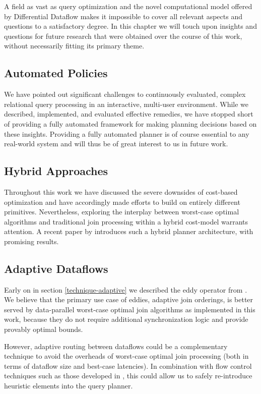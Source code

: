 \documentclass[../index.tex]{subfiles}
\begin{document}
A field as vast as query optimization and the novel computational
model offered by Differential Dataflow makes it impossible to cover
all relevant aspects and questions to a satisfactory degree. In this
chapter we will touch upon insights and questions for future research
that were obtained over the course of this work, without necessarily
fitting its primary theme.

\subsection{Automated Policies}

We have pointed out significant challenges to continuously evaluated,
complex relational query processing in an interactive, multi-user
environment. While we described, implemented, and evaluated effective
remedies, we have stopped short of providing a fully automated
framework for making planning decisions based on these
insights. Providing a fully automated planner is of course essential
to any real-world system and will thus be of great interest to us in
future work.

\subsection{Hybrid Approaches}

Throughout this work we have discussed the severe downsides of
cost-based optimization and have accordingly made efforts to build on
entirely different primitives. Nevertheless, exploring the interplay
between worst-case optimal algorithms and traditional join processing
within a hybrid cost-model warrants attention. A recent paper by
\cite{mhedhbi2019optimizing} introduces such a hybrid planner
architecture, with promising results.

\subsection{Adaptive Dataflows}

Early on in section \ref{technique-adaptive} we described the eddy
operator from \cite{avnur2000eddies}. We believe that the primary use
case of eddies, adaptive join orderings, is better served by
data-parallel worst-case optimal join algorithms as implemented in
this work, because they do not require additional synchronization
logic and provide provably optimal bounds.

However, adaptive routing between dataflows could be a complementary
technique to avoid the overheads of worst-case optimal join processing
(both in terms of dataflow size and best-case latencies). In
combination with flow control techniques such as those developed in
\cite{lattuada2016faucet}, this could allow us to safely re-introduce
heuristic elements into the query planner.
\end{document}
